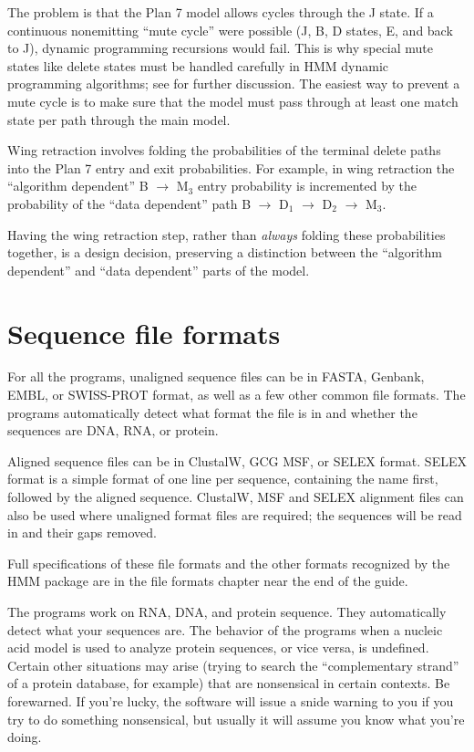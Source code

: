 The problem is that the Plan 7 model allows cycles through the J
state. If a continuous nonemitting ``mute cycle'' were possible (J, B,
D states, E, and back to J), dynamic programming recursions would
fail. This is why special mute states like delete states must be
handled carefully in HMM dynamic programming algorithms; see
\cite{Durbin98} for further discussion. The easiest way to
prevent a mute cycle is to make sure that the model must pass through
at least one match state per path through the main model.

Wing retraction involves folding the probabilities of the terminal
delete paths into the Plan 7 entry and exit probabilities. For
example, in wing retraction the ``algorithm dependent'' B
$\rightarrow$ M$_{3}$ entry probability is incremented by the
probability of the ``data dependent'' path B $\rightarrow$ D$_1$
$\rightarrow$ D$_2$ $\rightarrow$ M$_3$.

Having the wing retraction step, rather than {\em always} folding
these probabilities together, is a design decision, preserving a
distinction between the ``algorithm dependent'' and ``data dependent''
parts of the model.

\section{Sequence file formats}

For all the programs, unaligned sequence files can be in FASTA,
Genbank, EMBL, or SWISS-PROT format, as well as a few other common
file formats. The programs automatically detect what format the file
is in and whether the sequences are DNA, RNA, or protein.

Aligned sequence files can be in ClustalW, GCG MSF, or SELEX
format. SELEX format is a simple format of one line per sequence,
containing the name first, followed by the aligned sequence. ClustalW,
MSF and SELEX alignment files can also be used where unaligned format
files are required; the sequences will be read in and their gaps
removed. 

Full specifications of these file formats and the other formats
recognized by the HMM package are in the file formats chapter near the
end of the guide.

The programs work on RNA, DNA, and protein sequence. They
automatically detect what your sequences are. The behavior of the
programs when a nucleic acid model is used to analyze protein
sequences, or vice versa, is undefined. Certain other situations may
arise (trying to search the ``complementary strand'' of a protein
database, for example) that are nonsensical in certain contexts. Be
forewarned. If you're lucky, the software will issue a snide warning
to you if you try to do something nonsensical, but usually it will
assume you know what you're doing.

